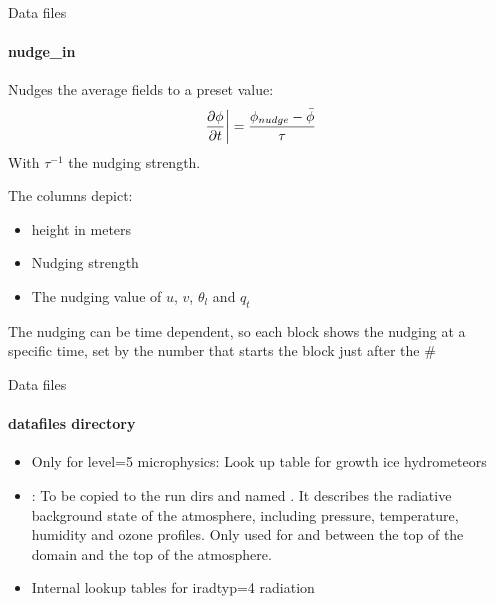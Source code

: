 \begin{frame}{Data files}
\framesubtitle{nudge\_in}
Nudges the average fields to a preset value:
\[
 \left.\frac{\partial \phi}{\partial t}\right| = \frac{\phi_{nudge} - \bar{\phi}}{\tau}
\]
 With $\tau^{-1}$ the nudging strength.


The columns depict:
\begin{itemize}
 \item height in meters
 \item Nudging strength
 \item The nudging value of $u$, $v$, $\theta_l$ and $q_t$
\end{itemize}

The nudging can be time dependent, so each block shows the nudging at a specific time, set by the number that starts the block just after the \#
\end{frame}

\begin{frame}{Data files}
\framesubtitle{datafiles directory}
\begin{itemize}
 \item {} Only for level=5 microphysics: Look up table for growth ice hydrometeors
 \item {}: To be copied to the run dirs and named . It describes the radiative background state of the atmosphere, including pressure, temperature, humidity and ozone profiles. Only used for  and between the top of the domain and the top of the atmosphere. 
 \item {} Internal lookup tables for iradtyp=4 radiation
\end{itemize}
\end{frame}

